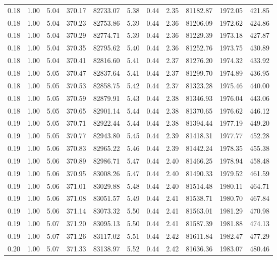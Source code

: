 \begin{table}[!ht]
\begin{tabular}{rrrrrrrrrrr}
0.18 & 1.00 & 5.04 & 370.17 & 82733.07 & 5.38 & 0.44 & 2.35 & 81182.87 & 1972.05 & 421.85 \\
0.18 & 1.00 & 5.04 & 370.23 & 82753.86 & 5.39 & 0.44 & 2.36 & 81206.09 & 1972.62 & 424.86 \\
0.18 & 1.00 & 5.04 & 370.29 & 82774.71 & 5.39 & 0.44 & 2.36 & 81229.39 & 1973.18 & 427.87 \\
0.18 & 1.00 & 5.04 & 370.35 & 82795.62 & 5.40 & 0.44 & 2.36 & 81252.76 & 1973.75 & 430.89 \\
0.18 & 1.00 & 5.04 & 370.41 & 82816.60 & 5.41 & 0.44 & 2.37 & 81276.20 & 1974.32 & 433.92 \\
0.18 & 1.00 & 5.05 & 370.47 & 82837.64 & 5.41 & 0.44 & 2.37 & 81299.70 & 1974.89 & 436.95 \\
0.18 & 1.00 & 5.05 & 370.53 & 82858.75 & 5.42 & 0.44 & 2.37 & 81323.28 & 1975.46 & 440.00 \\
0.18 & 1.00 & 5.05 & 370.59 & 82879.91 & 5.43 & 0.44 & 2.38 & 81346.93 & 1976.04 & 443.06 \\
0.18 & 1.00 & 5.05 & 370.65 & 82901.14 & 5.44 & 0.44 & 2.38 & 81370.65 & 1976.62 & 446.12 \\
0.19 & 1.00 & 5.05 & 370.71 & 82922.44 & 5.44 & 0.44 & 2.38 & 81394.44 & 1977.19 & 449.20 \\
0.19 & 1.00 & 5.05 & 370.77 & 82943.80 & 5.45 & 0.44 & 2.39 & 81418.31 & 1977.77 & 452.28 \\
0.19 & 1.00 & 5.06 & 370.83 & 82965.22 & 5.46 & 0.44 & 2.39 & 81442.24 & 1978.35 & 455.38 \\
0.19 & 1.00 & 5.06 & 370.89 & 82986.71 & 5.47 & 0.44 & 2.40 & 81466.25 & 1978.94 & 458.48 \\
0.19 & 1.00 & 5.06 & 370.95 & 83008.26 & 5.47 & 0.44 & 2.40 & 81490.33 & 1979.52 & 461.59 \\
0.19 & 1.00 & 5.06 & 371.01 & 83029.88 & 5.48 & 0.44 & 2.40 & 81514.48 & 1980.11 & 464.71 \\
0.19 & 1.00 & 5.06 & 371.08 & 83051.57 & 5.49 & 0.44 & 2.41 & 81538.71 & 1980.70 & 467.84 \\
0.19 & 1.00 & 5.06 & 371.14 & 83073.32 & 5.50 & 0.44 & 2.41 & 81563.01 & 1981.29 & 470.98 \\
0.19 & 1.00 & 5.07 & 371.20 & 83095.13 & 5.50 & 0.44 & 2.41 & 81587.39 & 1981.88 & 474.13 \\
0.19 & 1.00 & 5.07 & 371.26 & 83117.02 & 5.51 & 0.44 & 2.42 & 81611.84 & 1982.47 & 477.29 \\
0.20 & 1.00 & 5.07 & 371.33 & 83138.97 & 5.52 & 0.44 & 2.42 & 81636.36 & 1983.07 & 480.46 \\

\end{tabular}
\end{table}
